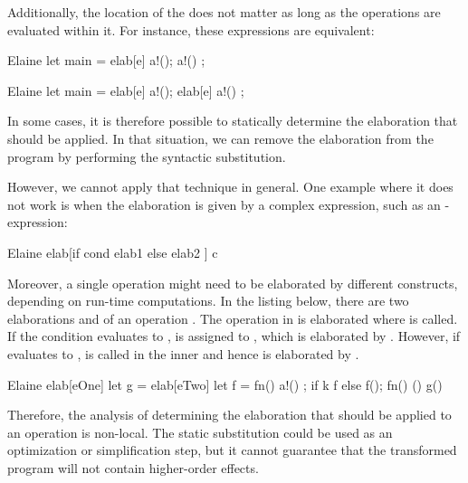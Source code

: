 Additionally, the location of the  does not matter as long as the operations are evaluated within it. For instance, these expressions are equivalent:

\begin{minipage}[b]{0.5\textwidth}
\begin{lst}{Elaine}
let main = elab[e] {
    a!();
    a!()
};
\end{lst}
\end{minipage}
\begin{minipage}[b]{0.5\textwidth}
\begin{lst}{Elaine}
let main = {
    elab[e] a!();
    elab[e] a!()
};
\end{lst}
\end{minipage}

In some cases, it is therefore possible to statically determine the elaboration that should be applied. In that situation, we can remove the elaboration from the program by performing the syntactic substitution.

However, we cannot apply that technique in general. One example where it does not work is when the elaboration is given by a complex expression, such as an -expression:
\begin{lst}{Elaine}
elab[if cond { elab1 } else { elab2 }] c
\end{lst}

Moreover, a single operation might need to be elaborated by different  constructs, depending on run-time computations. In the listing below, there are two elaborations  and  of an operation . The  operation in  is elaborated where  is called. If the condition  evaluates to ,  is assigned to , which is elaborated by . However, if  evaluates to ,  is called in the inner  and hence  is elaborated by .

\begin{lst}{Elaine}
elab[eOne] {
    let g = elab[eTwo] {
        let f = fn() { a!() };
        if k {
            f
        } else {
            f();
            fn() { () }
        }
    }
    g()
}
\end{lst}

Therefore, the analysis of determining the elaboration that should be applied to an operation is non-local. The static substitution could be used as an optimization or simplification step, but it cannot guarantee that the transformed program will not contain higher-order effects.

